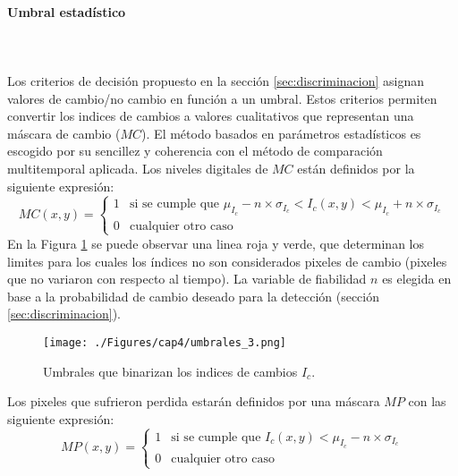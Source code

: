 \paragraph{Umbral estad\'istico} \label{sec:umbralEstadistico2}\mbox{}\\\mbox{}\\
Los criterios de decisi\'on propuesto en la secci\'on \ref{sec:discriminacion} asignan valores de cambio/no cambio en funci\'on a un umbral. Estos criterios permiten convertir los indices de cambios a valores cualitativos que representan una m\'ascara de cambio ($ MC $). El m\'etodo basados en par\'ametros estad\'isticos es escogido por su sencillez y coherencia con el m\'etodo de comparaci\'on multitemporal aplicada. Los niveles digitales de $ MC $ est\'an definidos por la siguiente expresi\'on:
\begin{equation}\label{ec:umbMetodo}
MC(x,y) = \begin{cases}
1 & \text{si se cumple que } \mu_{I_{c}} - n \times \sigma_{I_{c}} < I_{c}(x,y) < \mu_{I_{c}} + n \times \sigma_{I_{c}}\\
0 & \text{cualquier otro caso}  
\end{cases}
\end{equation}
En la Figura \ref{fig:umbrales} se puede observar una linea roja y verde, que determinan los limites para los cuales los \'indices no son considerados pixeles de cambio (pixeles que no variaron con respecto al tiempo). La variable de fiabilidad $ n $ es elegida en base a la probabilidad de cambio deseado para la detecci\'on (secci\'on \ref{sec:discriminacion}).
	\begin{figure}[H]
		\centering
		\texttt{[image: ./Figures/cap4/umbrales\_3.png]}
		\caption{Umbrales que binarizan los indices de cambios $ I_{c} $.}
		\label{fig:umbrales}
	\end{figure}
Los pixeles que sufrieron perdida estar\'an definidos por una m\'ascara $ MP $ con las siguiente expresi\'on:
\begin{equation}\label{ec:umbMetodoMP}
MP(x,y) = \begin{cases}
1 & \text{si se cumple que } I_{c}(x,y) < \mu_{I_{c}} - n \times \sigma_{I_{c}} \\
0 & \text{cualquier otro caso}  
\end{cases}
\end{equation}
